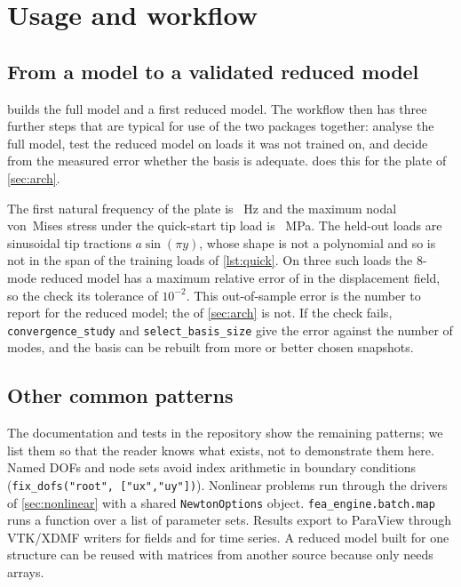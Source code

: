 \section{Usage and workflow}\label{sec:usage}

\subsection{From a model to a validated reduced model}
 builds the full model and a first reduced model. The workflow then has three further steps that are typical for use of the two packages together: analyse the full model, test the reduced model on loads it was not trained on, and decide
from the measured error whether the basis is adequate.  does this for the plate of \cref{sec:arch}.



The first natural frequency of the plate is \wfFirstHz{}~Hz and the maximum nodal von~Mises stress under the quick-start tip load is \wfVmMax{}~MPa. The held-out loads are sinusoidal tip tractions $a\sin(\pi y)$, whose shape is not a polynomial and so is not in the span of the training loads of \cref{lst:quick}.
On three such loads the 8-mode reduced model has a maximum relative error of \wfErr{} in the displacement field, so the check \wfPassed{} its tolerance of $10^{-2}$. This out-of-sample error is the number to report for the reduced model; the \qsErr{} of \cref{sec:arch} is not.
If the check fails, \texttt{convergence\_study} and \texttt{select\_basis\_size} give the error against the number of modes, and the basis can be rebuilt from more or better chosen snapshots.

\subsection{Other common patterns}
The documentation and tests in the repository show the remaining patterns; we list them so that the reader knows what exists, not to demonstrate them here.
Named DOFs and node sets avoid index arithmetic in boundary conditions (\texttt{fix\_dofs("root", ["ux","uy"])}). Nonlinear problems run through the drivers of \cref{sec:nonlinear} with a shared \texttt{NewtonOptions} object. \texttt{fea\_engine.batch.map} runs a function over a list of parameter sets.
Results export to ParaView through VTK/XDMF writers for fields and for time series. A reduced model built for one structure can be reused with matrices from another source because \rom{} only needs arrays.

